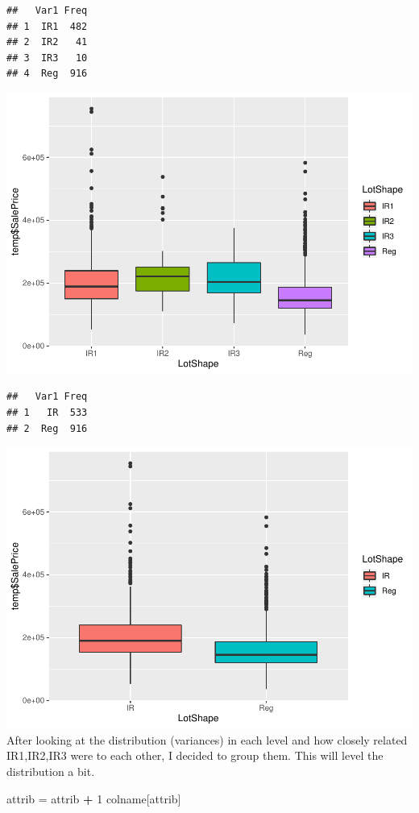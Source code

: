 \documentclass[]{article}
\newenvironment{Shaded}{\begin{snugshade}}{\end{snugshade}}
\newcommand{\DecValTok}[1]{\textcolor[rgb]{0.00,0.00,0.81}{#1}}
\newcommand{\StringTok}[1]{\textcolor[rgb]{0.31,0.60,0.02}{#1}}
\newcommand{\OperatorTok}[1]{\textcolor[rgb]{0.81,0.36,0.00}{\textbf{#1}}}
\newcommand{\NormalTok}[1]{#1}
\begin{document}
\begin{verbatim}
##   Var1 Freq
## 1  IR1  482
## 2  IR2   41
## 3  IR3   10
## 4  Reg  916
\end{verbatim}

\includegraphics{EDA_files/figure-latex/unnamed-chunk-30-1.pdf}

\begin{verbatim}
##   Var1 Freq
## 1   IR  533
## 2  Reg  916
\end{verbatim}

\includegraphics{EDA_files/figure-latex/unnamed-chunk-30-2.pdf} After
looking at the distribution (variances) in each level and how closely
related IR1,IR2,IR3 were to each other, I decided to group them. This
will level the distribution a bit.

\begin{Shaded}
\begin{Highlighting}[]
\NormalTok{attrib =}\StringTok{ }\NormalTok{attrib }\OperatorTok{+}\StringTok{ }\DecValTok{1}
\NormalTok{colname[attrib]}
\end{Highlighting}
\end{Shaded}
\end{document}
